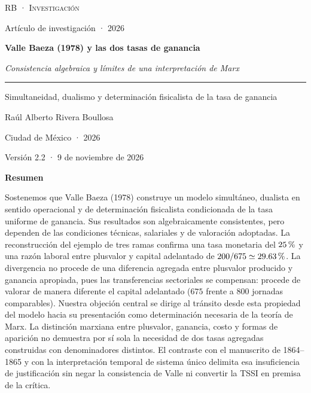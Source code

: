 \documentclass[10pt,twoside]{article}
\newcommand{\pct}{\ifmmode\text{\char37}\else\char37\fi}
\begin{document}
\thispagestyle{empty}
\vspace*{17mm}
\begin{center}
{\small\scshape RB · Investigación\par}
\vspace{3mm}
{\footnotesize Artículo de investigación · 2026\par}
\vspace{20mm}
{\Large\bfseries Valle Baeza (1978) y las dos tasas de ganancia\par}
\vspace{5mm}
{\normalsize\itshape Consistencia algebraica y límites de una interpretación de Marx\par}
\vspace{10mm}
\rule{32mm}{0.35pt}\par
\vspace{10mm}
{\small Simultaneidad, dualismo y determinación fisicalista de la tasa de ganancia\par}
\vspace{19mm}
{\normalsize Raúl Alberto Rivera Boullosa\par}
\vfill
{\footnotesize Ciudad de México · 2026\par}
\vspace{2mm}
{\footnotesize Versión 2.2 · 9 de noviembre de 2026\par}
\end{center}
\clearpage
\thispagestyle{plain}
\begin{center}
{\large\bfseries Resumen\par}
\end{center}
\vspace{3mm}
\noindent Sostenemos que Valle Baeza (1978) construye un modelo simultáneo, dualista en sentido operacional y de determinación fisicalista condicionada de la tasa uniforme de ganancia. Sus resultados son algebraicamente consistentes, pero dependen de las condiciones técnicas, salariales y de valoración adoptadas. La reconstrucción del ejemplo de tres ramas confirma una tasa monetaria del $25\,\pct$ y una razón laboral entre plusvalor y capital adelantado de $200/675\simeq29.63\,\pct$. La divergencia no procede de una diferencia agregada entre plusvalor producido y ganancia apropiada, pues las transferencias sectoriales se compensan: procede de valorar de manera diferente el capital adelantado ($675$ frente a $800$ jornadas comparables). Nuestra objeción central se dirige al tránsito desde esta propiedad del modelo hacia su presentación como determinación necesaria de la teoría de Marx. La distinción marxiana entre plusvalor, ganancia, costo y formas de aparición no demuestra por sí sola la necesidad de dos tasas agregadas construidas con denominadores distintos. El contraste con el manuscrito de 1864--1865 y con la interpretación temporal de sistema único delimita esa insuficiencia de justificación sin negar la consistencia de Valle ni convertir la TSSI en premisa de la crítica.\par
\end{document}
